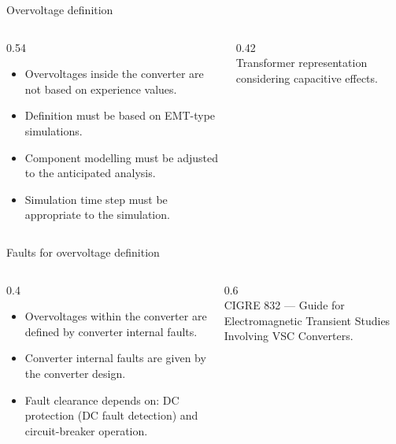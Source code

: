 \begin{frame}{Overvoltage definition}
  \begin{columns}[c,onlytextwidth]
    \begin{column}{0.54\textwidth}
      \begin{itemize}
        \setlength{\itemsep}{0.45em}
        \item Overvoltages inside the converter are not based on experience
              values.
        \item Definition must be based on EMT-type simulations.
        \item Component modelling must be adjusted to the anticipated analysis.
        \item Simulation time step must be appropriate to the simulation.
      \end{itemize}
    \end{column}
    \begin{column}{0.42\textwidth}
      \centering
      \\[0.3em]
      {\color{atGray}\footnotesize Transformer representation considering
      capacitive effects.}
    \end{column}
  \end{columns}
\end{frame}

\begin{frame}{Faults for overvoltage definition}
  \begin{columns}[c,onlytextwidth]
    \begin{column}{0.4\textwidth}
      \begin{itemize}
        \setlength{\itemsep}{0.4em}
        \item Overvoltages within the converter are defined by converter internal faults.
        \item Converter internal faults are given by the converter design.
        \item Fault clearance depends on: DC protection (DC fault detection)
              and circuit-breaker operation.
      \end{itemize}
      \vspace{0.3em}
    \end{column}
    \begin{column}{0.6\textwidth}
      \centering
      \\
      {\color{atGray}\footnotesize CIGRE 832 --- Guide for Electromagnetic Transient Studies Involving VSC Converters.}
    \end{column}
  \end{columns}
\end{frame}
